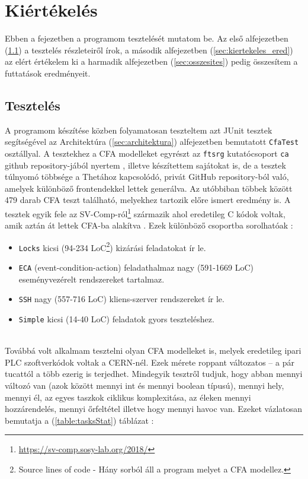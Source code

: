 \chapter{Kiértékelés}
\label{sec:kiertekeles}

Ebben a fejezetben a programom tesztelését mutatom be. Az első alfejezetben (\ref{sec:kiertekeles_teszt}) a tesztelés részleteiről írok, a második alfejezetben (\ref{sec:kiertekeles_ered}) az elért értékelem ki a harmadik alfejezetben (\ref{sec:osszesites}) pedig összesítem a futtatások eredményeit.

\section{Tesztelés}
\label{sec:kiertekeles_teszt}
A programom készítése közben folyamatosan teszteltem azt JUnit tesztek segítségével az Architektúra (\ref{sec:architektura}) alfejezetben bemutatott \texttt{CfaTest} osztállyal. A tesztekhez a CFA modelleket egyrészt az \texttt{ftsrg} kutatócsoport \texttt{ca} github repository-jából nyertem \cite{ca-lab-tests}, illetve készítettem sajátokat is, de a tesztek túlnyomó többsége a Thetához kapcsolódó, privát GitHub repository-ból való, amelyek különböző frontendekkel lettek generálva. Az utóbbiban többek között 479 darab CFA teszt található, melyekhez tartozik előre ismert eredmény is. A tesztek egyik fele az SV-Comp-ról\footnote{\url{https://sv-comp.sosy-lab.org/2018/}} származik ahol eredetileg C kódok voltak, amik aztán át lettek CFA-ba alakítva \cite{vpt2017}. Ezek különböző csoportba sorolhatóak \cite{akos-phd}:

\begin{itemize}
	\label{felsorolas}
	
	\item \texttt{Locks} kicsi (94-234 LoC\footnote{Source lines of code - Hány sorból áll a program melyet a CFA modellez.}) kizárási feladatokat ír le.
	
	\item \texttt{ECA} (event-condition-action) feladathalmaz nagy (591-1669 LoC) eseményvezérelt rendszereket tartalmaz.
	
	\item \texttt{SSH} nagy (557-716 LoC) kliens-szerver rendszereket ír le.
	
	\item \texttt{Simple} kicsi (14-40 LoC) feladatok gyors teszteléshez.
\end{itemize}
\ \\
Továbbá volt alkalmam tesztelni olyan CFA modelleket is, melyek eredetileg ipari PLC szoftverkódok voltak a CERN-nél. \cite{darvas2019plcverif} Ezek mérete roppant változatos -- a pár tucattól a több ezerig is terjedhet. Mindegyik tesztről tudjuk, hogy abban mennyi változó van (azok között mennyi int és mennyi boolean típusú), mennyi hely, mennyi él, az egyes taszkok ciklikus komplexitása, az éleken mennyi hozzárendelés, mennyi őrfeltétel illetve hogy mennyi havoc van. Ezeket vázlatosan bemutatja a (\ref{table:tasksStat}) táblázat \cite{akos-phd}:

